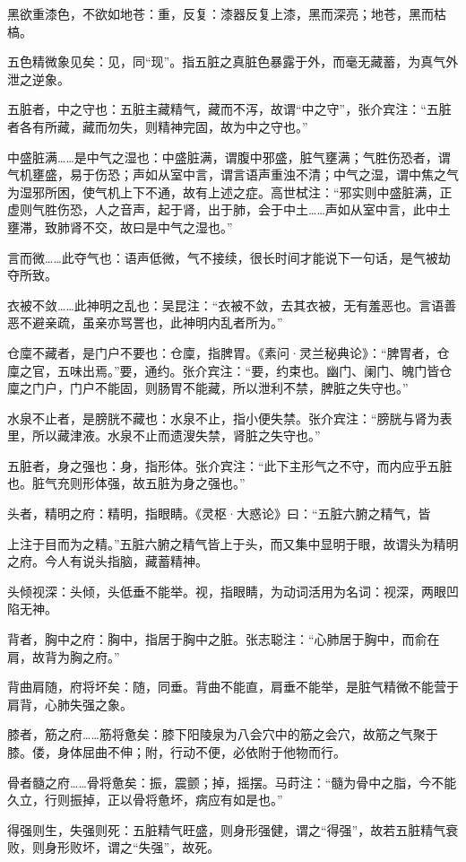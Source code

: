 \documentclass[12pt]{ctexbook}
\begin{document}
\begin{jiaozhu}
  \item 黑欲重漆色，不欲如地苍：重，反复：漆器反复上漆，黑而深亮；地苍，黑而枯槁。
  \item 五色精微象见矣：见，同“现”。指五脏之真脏色暴露于外，而毫无藏蓄，为真气外泄之逆象。
  \item 五脏者，中之守也：五脏主藏精气，藏而不泻，故谓“中之守”，张介宾注：“五脏者各有所藏，藏而勿失，则精神完固，故为中之守也。”
  \item 中盛脏满……是中气之湿也：中盛脏满，谓腹中邪盛，脏气壅满；气胜伤恐者，谓气机壅盛，易于伤恐；声如从室中言，谓言语声重浊不清；中气之湿，谓中焦之气为湿邪所困，使气机上下不通，故有上述之症。高世栻注：“邪实则中盛脏满，正虚则气胜伤恐，人之音声，起于肾，出于肺，会于中土……声如从室中言，此中土壅滞，致肺肾不交，故曰是中气之湿也。”
  \item 言而微……此夺气也：语声低微，气不接续，很长时间才能说下一句话，是气被劫夺所致。
  \item 衣被不敛……此神明之乱也：吴昆注：“衣被不敛，去其衣被，无有羞恶也。言语善恶不避亲疏，虽亲亦骂詈也，此神明内乱者所为。”
  \item 仓廩不藏者，是门户不要也：仓廩，指脾胃。《素问·灵兰秘典论》：“脾胃者，仓廩之官，五味出焉。”要，通约。张介宾注：“要，约束也。幽门、阑门、魄门皆仓廩之门户，门户不能固，则肠胃不能藏，所以泄利不禁，脾脏之失守也。”
  \item 水泉不止者，是膀胱不藏也：水泉不止，指小便失禁。张介宾注：“膀胱与肾为表里，所以藏津液。水泉不止而遗溲失禁，肾脏之失守也。”
  \item 五脏者，身之强也：身，指形体。张介宾注：“此下主形气之不守，而内应乎五脏也。脏气充则形体强，故五脏为身之强也。”
  \item 头者，精明之府：精明，指眼睛。《灵枢·大惑论》曰：“五脏六腑之精气，皆
  \item 上注于目而为之精。”五脏六腑之精气皆上于头，而又集中显明于眼，故谓头为精明之府。今人有说头指脑，藏蓄精神。
  \item 头倾视深：头倾，头低垂不能举。视，指眼睛，为动词活用为名词：视深，两眼凹陷无神。
  \item 背者，胸中之府：胸中，指居于胸中之脏。张志聪注：“心肺居于胸中，而俞在肩，故背为胸之府。”
  \item 背曲肩随，府将坏矣：随，同垂。背曲不能直，肩垂不能举，是脏气精微不能营于肩背，心肺失强之象。
  \item 膝者，筋之府……筋将惫矣：膝下阳陵泉为八会穴中的筋之会穴，故筋之气聚于膝。偻，身体屈曲不伸；附，行动不便，必依附于他物而行。
  \item 骨者髓之府……骨将惫矣：振，震颤；掉，摇摆。马莳注：“髓为骨中之脂，今不能久立，行则振掉，正以骨将惫坏，病应有如是也。”
  \item 得强则生，失强则死：五脏精气旺盛，则身形强健，谓之“得强”，故若五脏精气衰败，则身形败坏，谓之“失强”，故死。
\end{jiaozhu}
\end{document}
